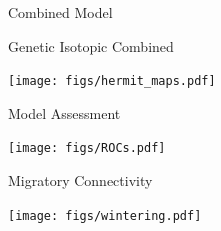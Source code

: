 \documentclass[11pt,ignorenonframetext,]{beamer}
\begin{document}
\begin{frame}{Combined Model}
\protect\hypertarget{combined-model}{}

\begin{center}
Genetic \qquad\qquad\qquad\quad
Isotopic \qquad\qquad\qquad\quad
Combined
\end{center}

\begin{center}
\texttt{[image: figs/hermit\_maps.pdf]}
\end{center}

\end{frame}

\begin{frame}{Model Assessment}
\protect\hypertarget{model-assessment}{}

\begin{center}
\texttt{[image: figs/ROCs.pdf]}
\end{center}

\end{frame}

\begin{frame}{Migratory Connectivity}
\protect\hypertarget{migratory-connectivity}{}

\begin{center}
\texttt{[image: figs/wintering.pdf]}
\end{center}

\end{frame}
\end{document}
